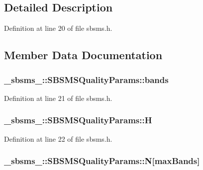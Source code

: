 \subsection{Detailed Description}


Definition at line 20 of file sbsms.\+h.



\subsection{Member Data Documentation}
\subsubsection[{\texorpdfstring{bands}{bands}}]{ \+\_\+sbsms\+\_\+\+::\+S\+B\+S\+M\+S\+Quality\+Params\+::bands}\hypertarget{struct__sbsms___1_1_s_b_s_m_s_quality_params_a12837690a45fa94b0534443d299d2f41}{}\label{struct__sbsms___1_1_s_b_s_m_s_quality_params_a12837690a45fa94b0534443d299d2f41}


Definition at line 21 of file sbsms.\+h.

\subsubsection[{\texorpdfstring{H}{H}}]{ \+\_\+sbsms\+\_\+\+::\+S\+B\+S\+M\+S\+Quality\+Params\+::H}\hypertarget{struct__sbsms___1_1_s_b_s_m_s_quality_params_a709b40781a537fb4380463de5b469b67}{}\label{struct__sbsms___1_1_s_b_s_m_s_quality_params_a709b40781a537fb4380463de5b469b67}


Definition at line 22 of file sbsms.\+h.

\subsubsection[{\texorpdfstring{N}{N}}]{ \+\_\+sbsms\+\_\+\+::\+S\+B\+S\+M\+S\+Quality\+Params\+::N\mbox{[}{\bf max\+Bands}\mbox{]}}\hypertarget{struct__sbsms___1_1_s_b_s_m_s_quality_params_a6afd86d066a4a45f9898d3be9e659c16}{}\label{struct__sbsms___1_1_s_b_s_m_s_quality_params_a6afd86d066a4a45f9898d3be9e659c16}



